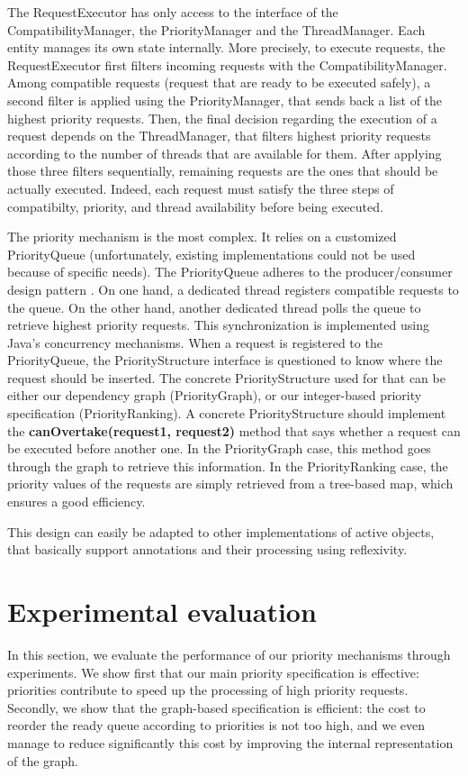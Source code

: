 \documentclass[11pt]{report}
\begin{document}
The RequestExecutor has only access to the interface of the CompatibilityManager, the PriorityManager and the ThreadManager. Each entity manages its own state internally. More precisely, to execute requests, the RequestExecutor first filters incoming requests with the CompatibilityManager. Among compatible requests (request that are ready to be executed safely), a second filter is applied using the PriorityManager, that sends back a list of the highest priority requests. Then, the final decision regarding the execution of a request depends on the ThreadManager, that filters highest priority requests according to the number of threads that are available for them. After applying those three filters sequentially, remaining requests are the ones that should be actually executed. Indeed, each request must satisfy the three steps of compatibilty, priority, and thread availability before being executed. 

The priority mechanism is the most complex. It relies on a customized PriorityQueue (unfortunately, existing implementations could not be used because of specific needs). The PriorityQueue adheres to the producer/consumer design pattern \cite{ref:producerconsumer}. On one hand, a dedicated thread registers compatible requests to the queue. On the other hand, another dedicated thread polls the queue to retrieve highest priority requests. This synchronization is implemented using Java's concurrency mechanisms. When a request is registered to the PriorityQueue, the PriorityStructure interface is questioned to know where the request should be inserted. The concrete PriorityStructure used for that can be either our dependency graph (PriorityGraph), or our integer-based priority specification (PriorityRanking). A concrete PriorityStructure should implement the \textbf{canOvertake(request1, request2)} method that says whether a request can be executed before another one. In the PriorityGraph case, this method goes through the graph to retrieve this information. In the PriorityRanking case, the priority values of the requests are simply retrieved from a tree-based map, which ensures a good efficiency.

This design can easily be adapted to other implementations of active objects, that basically support annotations and their processing using reflexivity. 


\section{Experimental evaluation}\label{sec:experiments}
In this section, we evaluate the performance of our priority mechanisms through experiments. 
We show first that our main priority specification is effective: priorities contribute to speed up the processing of high priority requests. Secondly, we show that the graph-based specification is efficient: the cost to reorder the ready queue according to priorities is not too high, and we even manage to reduce significantly this cost by improving the internal representation of the graph.
\end{document}
